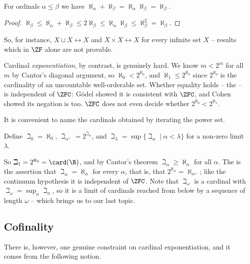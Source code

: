\begin{corollary}
  For ordinals $\alpha \leq \beta$ we have $\aleph_\alpha + \aleph_\beta = \aleph_\alpha \aleph_\beta = \aleph_\beta$.
\end{corollary}
\begin{proof}
  $\aleph_\beta \leq \aleph_\alpha+\aleph_\beta \leq 2 \aleph_\beta \leq \aleph_\alpha \aleph_\beta \leq \aleph_\beta^2=\aleph_\beta$.
\end{proof}

So, for instance, $X \sqcup X \leftrightarrow X$ and $X \times X \leftrightarrow X$ for every infinite set $X$ -- results which in $\ZF$ alone are not provable.

Cardinal \emph{exponentiation}, by contrast, is genuinely hard. We know $m < 2^m$ for all $m$ by Cantor's diagonal argument, so $\aleph_0 < 2^{\aleph_0}$, and $\aleph_1 \leq 2^{\aleph_0}$ since $2^{\aleph_0}$ is the cardinality of an uncountable well-orderable set. Whether equality holds -- the  -- is independent of $\ZFC$: G\"odel showed it is consistent with $\ZFC$, and Cohen showed its negation is too. $\ZFC$ does not even decide whether $2^{\aleph_0} < 2^{\aleph_1}$.

It is convenient to name the cardinals obtained by iterating the power set.

\begin{definition}
  Define $\beth_0 = \aleph_0$, $\beth_{\alpha^+} = 2^{\beth_\alpha}$, and $\beth_\lambda = \sup\{\beth_\alpha \mid \alpha < \lambda\}$ for a non-zero limit $\lambda$.
\end{definition}

So $\beth_1 = 2^{\aleph_0} = \card(\R)$, and by Cantor's theorem $\beth_\alpha \geq \aleph_\alpha$ for all $\alpha$. The  is the assertion that $\beth_\alpha = \aleph_\alpha$ for every $\alpha$, that is, that $2^{\aleph_\alpha} = \aleph_{\alpha^+}$; like the continuum hypothesis it is independent of $\ZFC$. Note that $\beth_\omega$ is a cardinal with $\beth_\omega = \sup_n \beth_n$, so it is a limit of cardinals reached from below by a sequence of length $\omega$ -- which brings us to our last topic.

\subsection{Cofinality}

There is, however, one genuine constraint on cardinal exponentiation, and it comes from the following notion.

